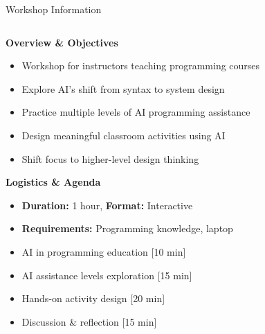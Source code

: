 \documentclass[xcolor=dvipsnames, aspectratio=169]{beamer}
\begin{document}
\begin{frame}{Workshop Information}
  \begin{columns}
    \begin{column}{0.58\textwidth}
      \textbf{Overview \& Objectives}
      \begin{itemize}\small
        \item Workshop for instructors teaching programming courses
        \item Explore AI's shift from syntax to system design
        \item Practice multiple levels of AI programming assistance
        \item Design meaningful classroom activities using AI
        \item Shift focus to higher-level design thinking
      \end{itemize}
      
      \textbf{Logistics \& Agenda}
      \begin{itemize}\small
        \item \textbf{Duration:} 1 hour, \textbf{Format:} Interactive
        \item \textbf{Requirements:} Programming knowledge, laptop
        \item AI in programming education [10 min]
        \item AI assistance levels exploration [15 min]
        \item Hands-on activity design [20 min]
        \item Discussion \& reflection [15 min]
      \end{itemize}
    \end{column}
    

\end{columns}
\end{frame}
\end{document}
